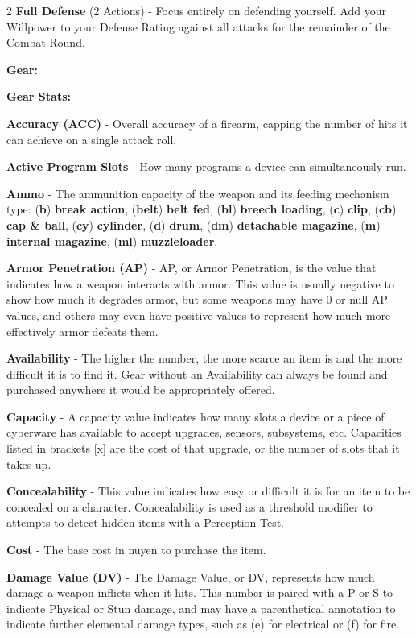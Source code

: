 \documentclass[
  oneside]{article}
\begin{document}
\begin{multicols}{2}
\textbf{Full Defense} (2 Actions) - Focus entirely
on defending yourself. Add your Willpower to your
Defense Rating against all attacks for the
remainder of the Combat Round.

\textbf{Gear:}

\textbf{Gear Stats:}

\textbf{Accuracy (ACC)} - Overall accuracy of a
firearm, capping the number of hits it can achieve
on a single attack roll.

\textbf{Active Program Slots} - How many programs
a device can simultaneously run.

\textbf{Ammo} - The ammunition capacity of the
weapon and its feeding mechanism type:
(\textbf{b}) \textbf{break action},
(\textbf{belt}) \textbf{belt fed}, (\textbf{bl})
\textbf{breech loading}, (\textbf{c})
\textbf{clip}, (\textbf{cb}) \textbf{cap \& ball},
(\textbf{cy}) \textbf{cylinder}, (\textbf{d})
\textbf{drum}, (\textbf{dm}) \textbf{detachable
magazine}, (\textbf{m}) \textbf{internal
magazine}, (\textbf{ml}) \textbf{muzzleloader}.

\textbf{Armor Penetration (AP)} - AP, or Armor
Penetration, is the value that indicates how a
weapon interacts with armor. This value is usually
negative to show how much it degrades armor, but
some weapons may have 0 or null AP values, and
others may even have positive values to represent
how much more effectively armor defeats them.

\textbf{Availability} - The higher the number, the
more scarce an item is and the more difficult it
is to find it. Gear without an Availability can
always be found and purchased anywhere it would be
appropriately offered.

\textbf{Capacity} - A capacity value indicates how
many slots a device or a piece of cyberware has
available to accept upgrades, sensors, subsystems,
etc. Capacities listed in brackets {[}x{]} are the
cost of that upgrade, or the number of slots that
it takes up.

\textbf{Concealability} - This value indicates how
easy or difficult it is for an item to be
concealed on a character. Concealability is used
as a threshold modifier to attempts to detect
hidden items with a Perception Test.

\textbf{Cost} - The base cost in nuyen to purchase
the item.

\textbf{Damage Value (DV)} - The Damage Value, or
DV, represents how much damage a weapon inflicts
when it hits. This number is paired with a P or S
to indicate Physical or Stun damage, and may have
a parenthetical annotation to indicate further
elemental damage types, such as (e) for electrical
or (f) for fire.


\end{multicols}
\end{document}
